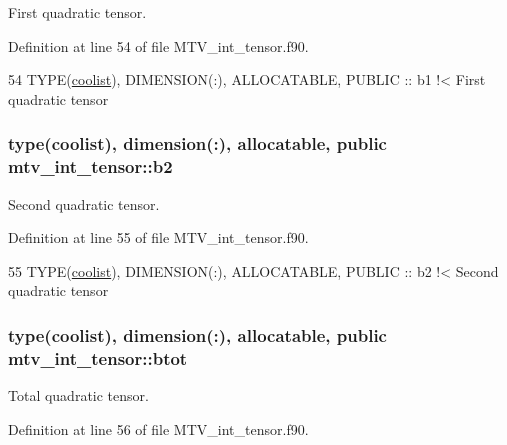 First quadratic tensor. 



Definition at line 54 of file M\+T\+V\+\_\+int\+\_\+tensor.\+f90.


\begin{DoxyCode}
54   \textcolor{keywordtype}{TYPE}(\hyperlink{structtensor_1_1coolist}{coolist}), \textcolor{keywordtype}{DIMENSION(:)}, \textcolor{keywordtype}{ALLOCATABLE}, \textcolor{keywordtype}{PUBLIC} :: b1\textcolor{comment}{ !< First quadratic tensor}
\end{DoxyCode}
\subsubsection[{\texorpdfstring{b2}{b2}}]{\setlength{\rightskip}{0pt plus 5cm}type({\bf coolist}), dimension(\+:), allocatable, public mtv\+\_\+int\+\_\+tensor\+::b2}\hypertarget{namespacemtv__int__tensor_a71cc55d84fa25e49c9886d5ac9fc5032}{}\label{namespacemtv__int__tensor_a71cc55d84fa25e49c9886d5ac9fc5032}


Second quadratic tensor. 



Definition at line 55 of file M\+T\+V\+\_\+int\+\_\+tensor.\+f90.


\begin{DoxyCode}
55   \textcolor{keywordtype}{TYPE}(\hyperlink{structtensor_1_1coolist}{coolist}), \textcolor{keywordtype}{DIMENSION(:)}, \textcolor{keywordtype}{ALLOCATABLE}, \textcolor{keywordtype}{PUBLIC} :: b2\textcolor{comment}{ !< Second quadratic tensor}
\end{DoxyCode}
\subsubsection[{\texorpdfstring{btot}{btot}}]{\setlength{\rightskip}{0pt plus 5cm}type({\bf coolist}), dimension(\+:), allocatable, public mtv\+\_\+int\+\_\+tensor\+::btot}\hypertarget{namespacemtv__int__tensor_a888f93868eeb459582a5acc909a33374}{}\label{namespacemtv__int__tensor_a888f93868eeb459582a5acc909a33374}


Total quadratic tensor. 



Definition at line 56 of file M\+T\+V\+\_\+int\+\_\+tensor.\+f90.


